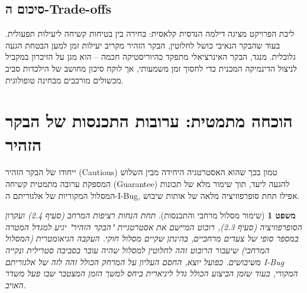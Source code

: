 \documentclass[12pt, a4paper]{article}
\newtheorem{theorem}{משפט}
\begin{document}
\subsection{סיכום ה-\textenglish{Trade-offs}}
ליבת הפרויקט מציגה דילמה הנדסית קלאסית: בחירה בין בטיחות קשיחה ליעילות תפעולית. בעוד שהבקר הנאיבי כושל לחלוטין, הבקר הזהיר מקריב יעילות זמן למען הבטחת הגעה גלובלית. מנגד, הבקר האינרציאלי מתפקד כהיוריסטיקה חכמה – הוא מגן על הזיכרון במקביל לניצול הדינמיקה המכנית כדי לחסוך זמן משמעותי, אך לוקח סיכון מחושב של הילכדות סביב מכשולים מורכבים מבחינה טופולוגית.

\section{הוכחה מתמטית: ערובות התכנסות של הבקר הזהיר}
ייחודו של הבקר הזהיר (\textenglish{Cautious}) טמון בכך שהוא האסטרטגיה היחידה מבין השלוש המספקת ערובה מתמטית קשיחה (\textenglish{Guarantee}) להגעה ליעד, תוך שימור מלא של תכונות המסלול המקוריות של אלגוריתם ה-\textenglish{I-Bug}, אפילו תחת סופרפוזיציה מלאה של אותות שיבוש.

\begin{theorem}[שימור מסלול מרחבי והתכנסות]
תחת הנחות רציפות המרחב (סעיף 2.4) ועקרון הסופרפוזיציה (סעיף 2.3), רובוט המיישם את אסטרטגיית "הבקר הזהיר" יגיע למגדל המטרה במספר סופי של צעדים מרחביים, בהינתן שקיים מסלול חוקי. העקבה הגיאומטרית (המסלול המרחבי) שיעבור הרובוט זהה לחלוטין למסלול שהיה עובר בסביבה סטרילית ונקייה משיבושים. כפועל יוצא, החסם העליון על המרחק הכולל זהה לזה של אלגוריתם \textenglish{I-Bug} המקורי, בעוד שזמן הביצוע הכולל גדל ליניארית ביחס למשך הזמן המצטבר שבו פעל משדר האויב.
\end{theorem}
\end{document}
